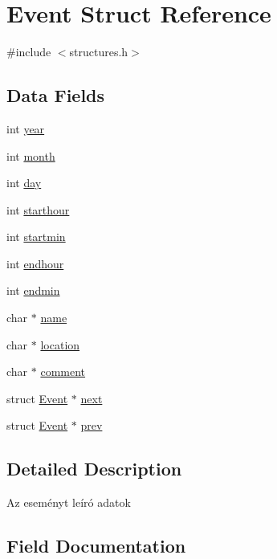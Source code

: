 \hypertarget{struct_event}{}\section{Event Struct Reference}
\label{struct_event}


{\ttfamily \#include $<$structures.\+h$>$}

\subsection*{Data Fields}
\begin{DoxyCompactItemize}
\item 
int \hyperlink{struct_event_abeac221e38b7b9ce7df8722c842bf671}{year}
\item 
int \hyperlink{struct_event_aedb06abe5aff12fa3e7e0e71a374edfb}{month}
\item 
int \hyperlink{struct_event_a4c11afc03fc3ee49bab660def6558f2a}{day}
\item 
int \hyperlink{struct_event_ad40616cbc61c79a6caf6c8c2464bab8d}{starthour}
\item 
int \hyperlink{struct_event_a6a7bf86ae11349bf260da9abce25452a}{startmin}
\item 
int \hyperlink{struct_event_a23ec0f5427aad3f169339f21523d2041}{endhour}
\item 
int \hyperlink{struct_event_ac9b41151b48114ff949e78b68a81572b}{endmin}
\item 
char $\ast$ \hyperlink{struct_event_a5ac083a645d964373f022d03df4849c8}{name}
\item 
char $\ast$ \hyperlink{struct_event_a6a0d5603410d5eda93c0ff341966cce1}{location}
\item 
char $\ast$ \hyperlink{struct_event_a25dae25c3bf9b28d54eb4df7afb2a491}{comment}
\item 
struct \hyperlink{struct_event}{Event} $\ast$ \hyperlink{struct_event_a306f86f79bc8a24df2ff2989f10ea5b8}{next}
\item 
struct \hyperlink{struct_event}{Event} $\ast$ \hyperlink{struct_event_a587efee11d7ca5779c56b343342c65f9}{prev}
\end{DoxyCompactItemize}


\subsection{Detailed Description}
Az eseményt leíró adatok 

\subsection{Field Documentation}
\mbox{\label{struct_event_a25dae25c3bf9b28d54eb4df7afb2a491}} 
